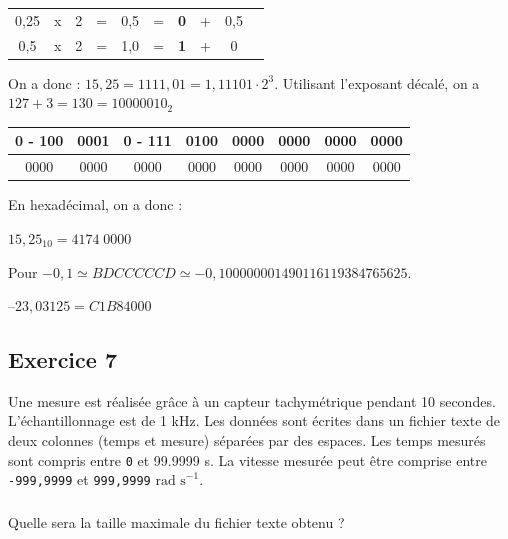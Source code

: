 \documentclass[10pt,fleqn]{article} %
\begin{document}
\begin{multicols}{2}
\begin{corrige}
\begin{tabular}{cccccccccc}
0,25 & x & 2 & = & 0,5 & =& \textbf{0} & + & 0,5 \\
0,5 & x & 2 & = & 1,0 & =& \textbf{1} & + & 0 \\
\end{tabular}

On a donc : $15,25=1111,01 = 1,11101 \cdot 2^{3}$. Utilisant l'exposant décalé, on a $127+3 = 130=10000010_2$

\noindent \begin{tabular}{|c|c|c|c|c|c|c|c|}
\hline
0 - 100&0001 & 0 - 111& 0100& 0000& 0000& 0000& 0000 \\
\hline
0000 & 0000& 0000& 0000& 0000& 0000& 0000& 0000 \\
\hline
\end{tabular}

En hexadécimal, on a donc :

 $15,25_{10} =4174\; 0000 $


Pour $-0,1\simeq BDCCCCCD \simeq -0,100000001490116119384765625$.

$–23,03125 = C1B84000$
\end{corrige}
\else
\fi

\subsection*{Exercice 7}
\setcounter{subparagraph}{0}
Une mesure est réalisée grâce à un capteur tachymétrique pendant 10 secondes. L'échantillonnage est de 1 kHz. Les données sont écrites dans un fichier texte de deux colonnes (temps et mesure) séparées par des espaces. Les temps mesurés sont compris entre \texttt{0} et {99.9999} s. La vitesse mesurée peut être comprise entre \texttt{-999,9999} et \texttt{999,9999} $\text{rad s}^{-1}$.
\subparagraph*{}\textit{}{Quelle sera la taille maximale du fichier texte obtenu ?}





\end{multicols}
\end{document}
